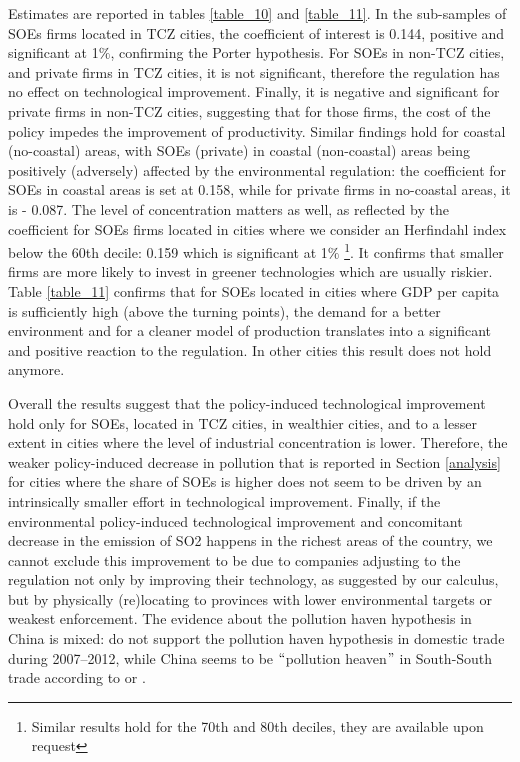 \documentclass[12pt]{article}
\begin{document}
Estimates are reported in tables \ref{table_10} and \ref{table_11}. In the sub-samples of SOEs firms located in TCZ cities, the coefficient of interest is 0.144, positive and significant at 1$\%$, confirming the Porter hypothesis. For SOEs in non-TCZ cities, and private firms in TCZ cities, it is not significant, therefore the regulation has no effect on technological improvement. Finally, it is negative and significant for private firms in non-TCZ cities, suggesting that for those firms, the cost of the policy impedes the improvement of productivity. Similar findings hold for coastal (no-coastal) areas, with SOEs (private) in coastal (non-coastal) areas being positively (adversely) affected by the environmental regulation: the coefficient for SOEs in coastal areas is set at 0.158, while for private firms in no-coastal areas, it is - 0.087. The level of concentration matters as well, as reflected by the coefficient for SOEs firms located in cities where we consider an Herfindahl index below the 60th decile: 0.159 which is significant at 1$\%$ \footnote{Similar results hold for the 70th and 80th deciles, they are available upon request}. It confirms that smaller firms are more likely to invest in greener technologies which are usually riskier. Table \ref{table_11} confirms that for SOEs located in cities where GDP per capita is sufficiently high (above the turning points), the demand for a better environment and for a cleaner model of production translates into a significant and positive reaction to the regulation. In other cities this result does not hold anymore. 


Overall the results suggest that the policy-induced technological improvement hold only for SOEs, located in TCZ cities, in wealthier cities, and to a lesser extent in cities where the level of industrial concentration is lower. Therefore, the weaker policy-induced decrease in pollution that is reported in Section \ref{analysis} for cities where the share of SOEs is higher does not seem to be driven by an intrinsically smaller effort in technological improvement. Finally, if the environmental policy-induced technological improvement and concomitant decrease in the emission of SO2 happens in the richest areas of the country, we cannot exclude this improvement to be due to companies adjusting to the regulation not only by improving their technology, as suggested by our calculus, but by physically (re)locating to provinces with lower environmental targets or weakest enforcement. The evidence about the pollution haven hypothesis in China is mixed: \cite{Wang2019-ju} do not support the pollution haven hypothesis in domestic trade during 2007–2012, while China seems to be $``$pollution heaven$"$ in South-South trade according to \cite{Lin2019-ft} or \cite{Sun2017-la}.
\end{document}
